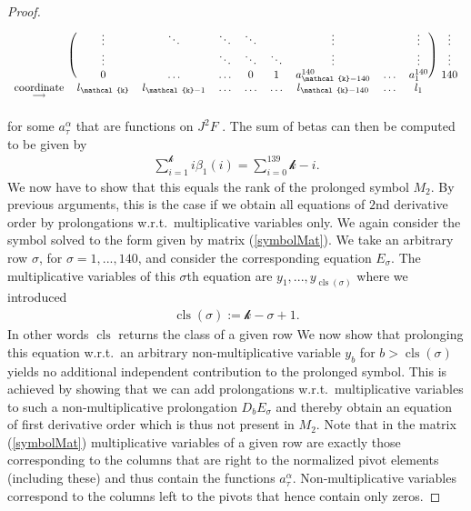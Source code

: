 \begin{proof}
\begin{align}
\begin{blockarray}{cccccccccc}
\begin{block}{c(cccccccc)c}
    & \vdots & \ddots  & \ddots & \ddots &  & \vdots & & \vdots & \vdots \\
    & \vdots & & \ddots & \ddots & \ddots & \vdots & & \vdots &  \vdots\\
    & 0 & \hdots  & \hdots & 0 & 1 & a^{140}_{\mathcal{k}-140} & \hdots & a^{140}_{1} &  140 \\
\end{block}
\underset{\longrightarrow}{\text{coordinate}} & l_{\mathcal{k}} & l_{\mathcal{k} -1} & \hdots & \hdots & \hdots & l_{\mathcal{k}- 140} & \hdots & l_1 &
\end{blockarray}
\end{align}
for some $a^{\alpha}_{\tau}$ that are functions on $J^2F$ . The sum of betas can then be computed to be given by
\begin{align}
    \sum_{i=1}^{\mathcal{k}} i \beta_1(i) = \sum_{i = 0}^{139} \mathcal{k} - i .
\end{align}
We now have to show that this equals the rank of the prolonged symbol $M_2$. By previous arguments, this is the case if we obtain all equations of $2$nd derivative order by prolongations w.r.t.\ multiplicative variables only. We again consider the symbol solved to the form given by matrix (\ref{symbolMat}). 
We take an arbitrary row $\sigma$, for $\sigma=1,...,140$, and consider the corresponding equation $E_{\sigma}$. The multiplicative variables of this $\sigma$th equation are $y_1,...,y_{\operatorname{cls}(\sigma)}$ where we introduced
\begin{align}
\operatorname{cls}(\sigma):= \mathcal{k} - \sigma +1.
\end{align}
In other words $\operatorname{cls}$ returns the class of a given row
We now show that prolonging this equation w.r.t.\ an arbitrary non-multiplicative variable $y_b$ for $b>\operatorname{cls}(\sigma)$ yields no additional independent contribution to the prolonged symbol. This is achieved by showing that we can add prolongations w.r.t.\ multiplicative variables to such a non-multiplicative prolongation $D_bE_{\sigma}$ and thereby obtain an equation of first derivative order which is thus not present in $M_2$. Note that in the matrix (\ref{symbolMat}) multiplicative variables of a given row are exactly those corresponding to the columns that are right to the normalized pivot elements (including these) and thus contain the functions $a^{\alpha}_{\tau}$. Non-multiplicative variables correspond to the columns left to the pivots that hence contain only zeros.


\end{proof}
